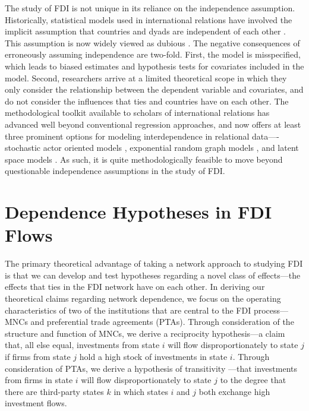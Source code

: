 \documentclass{article}
\begin{document}
The study of FDI is not unique in its reliance on the independence assumption. Historically, statistical models used in international relations have involved the implicit assumption that countries and dyads are independent of each other \citep{diehl2016conditional,ward2007persistent}. This assumption is now widely viewed as dubious \citep[see, e.g., ][]{ward2007persistent, chu2010homogenization,cranmer2016critique,dorff2013networks,lee2013network,howell2013geography,kinne2016agreeing}. The negative consequences of erroneously assuming independence are two-fold. First, the model is misspecified, which leads to biased estimates and hypothesis tests for covariates included in the model. Second, researchers arrive at a limited theoretical scope in which they only consider the relationship between the dependent variable and covariates, and do not consider the influences that ties and countries have on each other. The methodological toolkit available to scholars of international relations has advanced well beyond conventional regression approaches, and now offers at least three prominent options for modeling interdependence in relational data----stochastic actor oriented models \citep[e.g., ][]{camber2010geometry,kinne2016agreeing,kinne2013network,kinne2014dependent,warren2016modeling}, exponential random graph models \citep[e.g.,][]{cranmer2012complex,cranmer2012toward,raeymaeckers2016influence}, and latent space models \citep[e.g., ][]{ward2007disputes,ward2013gravity,metternich2013antigovernment}. As such, it is quite methodologically feasible to move beyond questionable independence assumptions in the study of FDI.


\section{Dependence Hypotheses in FDI Flows}

The primary theoretical advantage of taking a network approach to studying FDI is that we can develop and test hypotheses regarding a novel class of effects---the effects that ties in the FDI network have on each other. In deriving our theoretical claims regarding network dependence, we focus on the operating characteristics of two of the institutions that are central to the FDI process---MNCs and preferential trade agreements (PTAs). Through consideration of the structure and function of MNCs, we derive a reciprocity \citep{garlaschelli2004patterns} hypothesis---a claim that, all else equal, investments from state $i$ will flow disproportionately to state $j$ if firms from state $j$ hold a high stock of investments in state $i$. Through consideration of PTAs, we derive a hypothesis of transitivity \citep{holland1971transitivity}---that investments from firms in state $i$ will flow disproportionately to state $j$ to the degree that there are third-party states $k$ in which states $i$ and $j$ both exchange high investment flows.
\end{document}
